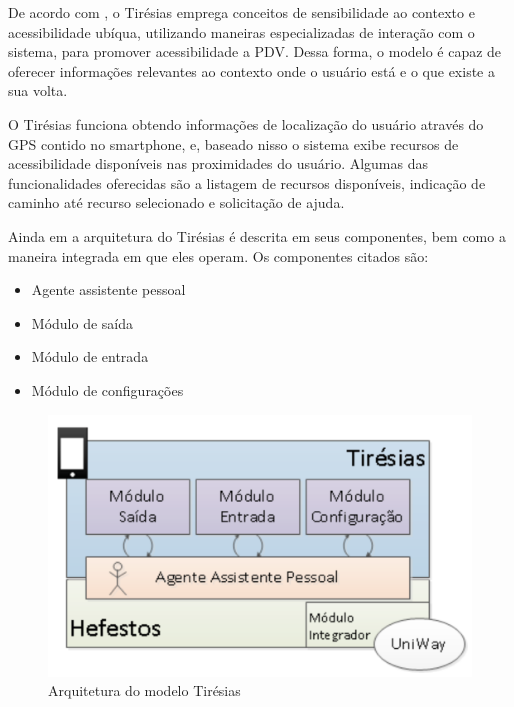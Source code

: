 \documentclass[english,brazilian]{UNISINOSmonografia}
\begin{document}
De acordo com , o Tirésias emprega conceitos de sensibilidade ao contexto e acessibilidade ubíqua, utilizando maneiras especializadas de interação com o sistema, para promover acessibilidade a PDV. Dessa forma, o modelo é capaz de oferecer informações relevantes ao contexto onde o usuário está e o que existe a sua volta.

O Tirésias funciona obtendo informações de localização do usuário através do GPS contido no smartphone, e, baseado nisso o sistema exibe recursos de acessibilidade disponíveis nas proximidades do usuário. Algumas das funcionalidades oferecidas são a listagem de recursos disponíveis, indicação de caminho até recurso selecionado e solicitação de ajuda.

Ainda em  a arquitetura do Tirésias é descrita em seus componentes, bem como a maneira integrada em que eles operam. Os componentes citados são:

\begin{itemize} 
	\item Agente assistente pessoal
	\item Módulo de saída
	\item Módulo de entrada
	\item Módulo de configurações
\end{itemize}

\FloatBarrier
\begin{figure}[!ht]
	\caption{Arquitetura do modelo Tirésias}
	\label{fig:visaoGeral}
	\centering%
	\begin{minipage}{.6\textwidth}
		\includegraphics[width=\textwidth]{imgs/tiresiasArquitetura}
		\end{minipage}
\end{figure}
\FloatBarrier
\end{document}
